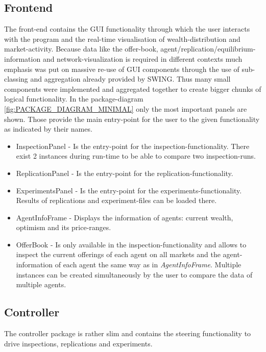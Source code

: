 \documentclass[Bachelorarbeit.tex]{subfiles}
\begin{document}
\subsection{Frontend}
The front-end contains the GUI functionality through which the user interacts with the program and the real-time visualisation of wealth-distribution and market-activity. Because data like the offer-book, agent/replication/equilibrium-information and network-visualization is required in different contexts much emphasis was put on massive re-use of GUI components through the use of sub-classing and aggregation already provided by SWING. Thus many small components were implemented and aggregated together to create bigger chunks of logical functionality. In the package-diagram \ref{fig:PACKAGE_DIAGRAM_MINIMAL} only the most important panels are shown. Those provide the main entry-point for the user to the given functionality as indicated by their names.

\begin{itemize}
\item InspectionPanel - Is the entry-point for the inspection-functionality. There exist 2 instances during run-time to be able to compare two inspection-runs.
\item ReplicationPanel - Is the entry-point for the replication-functionality.
\item ExperimentsPanel - Is the entry-point for the experiments-functionality. Results of replications and experiment-files can be loaded there.
\item AgentInfoFrame - Displays the information of agents: current wealth, optimism and its price-ranges.
\item OfferBook - Is only available in the inspection-functionality and allows to inspect the current offerings of each agent on all markets and the agent-information of each agent the same way as in \textit{AgentInfoFrame}. Multiple instances can be created simultaneously by the user to compare the data of multiple agents.
\end{itemize}

\subsection{Controller}
The controller package is rather slim and contains the steering functionality to drive inspections, replications and experiments. 
\end{document}

